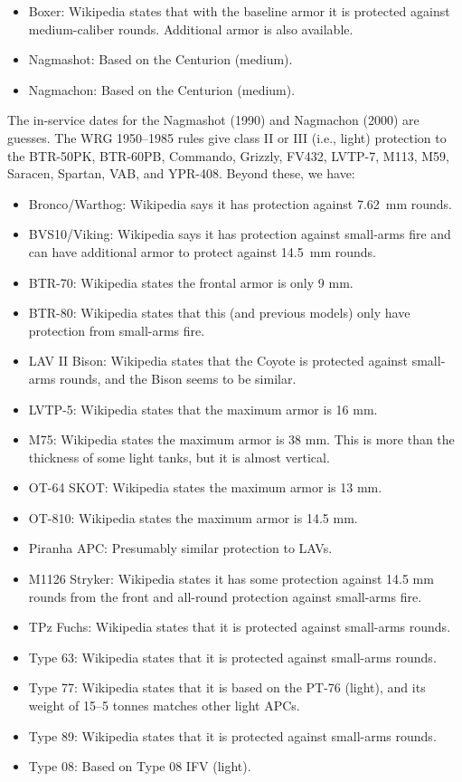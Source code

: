 {    
    \begin{itemize}
        \item Boxer: Wikipedia states that with the baseline armor it is protected against medium-caliber rounds. Additional armor is also available.
        \item Nagmashot: Based on the Centurion (medium).
        \item Nagmachon: Based on the Centurion (medium).
    \end{itemize}
    The in-service dates for the Nagmashot (1990) and Nagmachon (2000) are guesses.
    The WRG 1950--1985 rules give class II or III (i.e., light) protection to the
    BTR-50PK,
    BTR-60PB,
    Commando,
    Grizzly,
    FV432,
    LVTP-7,
    M113,
    M59,
    Saracen,
    Spartan,
    VAB, and
    YPR-408.
    Beyond these, we have:
    \begin{itemize}
        \item Bronco/Warthog: Wikipedia says it has protection against 7.62~mm rounds.
        \item BVS10/Viking: Wikipedia says it has protection against small-arms fire and can have additional armor to protect against 14.5~mm rounds.
        \item BTR-70: Wikipedia states the frontal armor is only 9 mm.
        \item BTR-80: Wikipedia states that this (and previous models) only have protection from small-arms fire.
        \item LAV II Bison: Wikipedia states that the Coyote is protected against small-arms rounds, and the Bison seems to be similar.
        \item LVTP-5: Wikipedia states that the maximum armor is 16 mm.
        \item M75: Wikipedia states the maximum armor is 38 mm. This is more than the thickness of some light tanks, but it is almost vertical.
        \item OT-64 SKOT: Wikipedia states the maximum armor is 13 mm.
        \item OT-810: Wikipedia states the maximum armor is 14.5 mm.
        \item Piranha APC: Presumably similar protection to LAVs.
        \item M1126 Stryker: Wikipedia states it has some protection against 14.5 mm rounds from the front and all-round protection against small-arms fire.
        \item TPz Fuchs: Wikipedia states that it is protected against small-arms rounds.
        \item Type 63: Wikipedia states that it is protected against small-arms rounds.
        \item Type 77: Wikipedia states that it is based on the PT-76 (light), and its weight of 15--5 tonnes matches other light APCs.
        \item Type 89: Wikipedia states that it is protected against small-arms rounds.
        \item Type 08: Based on Type 08 IFV (light).
    \end{itemize}

}
